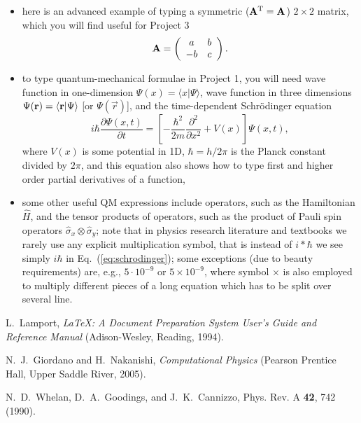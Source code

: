 \documentclass[12pt]{article}
\begin{document}
\begin{itemize}
\item here is an advanced example of typing a symmetric (${\bf A}^{\rm T}={\bf A}$) $2 \times 2$ matrix, which you will find useful for Project 3
\begin{equation} \label{eq:matrix}
{\bf A}=\left( \begin{array}{cc}
     a & b \\
    -b & c
  \end{array} \right).
\end{equation}

\item to type quantum-mechanical formulae in Project 1, you will need wave function in one-dimension $\Psi(x)=\langle x | \Psi \rangle$, wave function in three dimensions $\Psi({\bf r})=\langle {\bf r} | \Psi \rangle$ [or $\Psi(\vec{r})$], and the time-dependent Schr\"{o}dinger equation 
\begin{equation}\label{eq:schrodinger}
i \hbar \frac{\partial \Psi(x,t)}{\partial t} = \left[ -\frac{\hbar^2}{2m}  \frac{\partial^2}{\partial x^2}+V(x) \right] \Psi(x,t),
\end{equation}
where $V(x)$ is some potential in 1D, $\hbar=h/2\pi$ is the Planck constant divided by $2\pi$, and this equation also shows how to type first and higher order partial derivatives of a function,

\item some other useful QM expressions include operators, such as the Hamiltonian $\hat{H}$, and the tensor products of operators, such as the product of Pauli spin operators $\hat{\sigma}_x \otimes \hat{\sigma}_y$; note that in physics research literature and textbooks we rarely use any explicit multiplication symbol, that is instead of $i * \hbar$ we see simply $i\hbar$ in Eq.~(\ref{eq:schrodinger}); some exceptions (due to beauty requirements) are, e.g., $5 \cdot 10^{-9}$ or $5 \times 10^{-9}$, where symbol $\times$ is also employed to multiply different pieces of a long equation which has to be split over several line.

\end{itemize}



\begin{thebibliography}{99}


 L.~Lamport, {\em \LaTeX: A Document Preparation System User's Guide and Reference Manual} (Adison-Wesley, Reading, 1994).

 N.~J.~Giordano and H.~Nakanishi, {\em Computational Physics} (Pearson Prentice Hall, Upper Saddle River, 2005).

 N.~D.~Whelan, D.~A.~Goodings, and J.~K.~Cannizzo, Phys. Rev. A {\bf 42}, 742 (1990).

\end{thebibliography}
\end{document}
